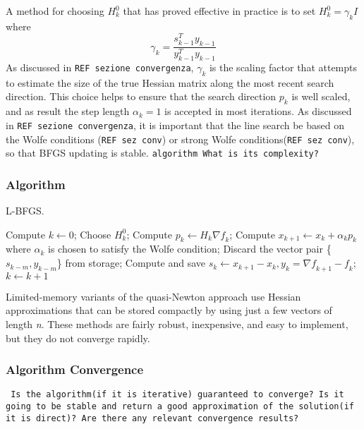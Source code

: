 A method for choosing $H^0_{k}$ that has proved effective in practice is to set $H^0_{k}=\gamma_{k}I$  where 
\begin{equation}
\gamma_{k}= \frac{s^T_{k-1}y_{k-1}}{y^T_{k-1}y_{k-1}}
\end{equation}
As discussed in \texttt{REF sezione convergenza}, $\gamma_{k}$ is the scaling factor that attempts to estimate the size of the true Hessian matrix along the most recent search direction. This choice helps to ensure that the search direction $p_{k}$ is well scaled, and as result the step length $\alpha_{k}=1$ is accepted in most iterations. As discussed in \texttt{REF sezione convergenza}, it is important that the line search be based on the Wolfe conditions (\texttt{REF sez conv}) or strong Wolfe conditions(\texttt{REF sez conv}), so that BFGS updating is stable. 
\texttt{algorithm What is its complexity?}

\subsubsection{Algorithm}
\begin{algorithm}[H]
	\caption{L-BFGS.}
	\label{alg:sgd}
	\begin{algorithmic}[4]
		\State Compute $k \gets 0$;
		\Repeat
		\State Choose \textbf{$H^0_k$};
		\State Compute $p_k \gets H_k\nabla \textit{f}_k$;
		\State Compute $x_{k+1} \gets x_{k}+ \alpha_{k}p_{k}$ where $\alpha_{k}$ is chosen to satisfy the Wolfe condition;
		\State Discard the vector pair \{$s_{k-m},y_{k-m}$\} from storage;
		\EndIf
		\State Compute and save $s_k \gets x_{k+1}-x_{k}, y_k=\nabla \textit{f}_{k+1}-\textit{f}_k$;
		\State $k \gets k+1$
		\EndProcedure 
	\end{algorithmic}
\end{algorithm}


Limited-memory variants  of  the  quasi-Newton  approach use  Hessian  approximations  that  can  be stored compactly by using just a few vectors of length \textit{n}. These methods are fairly robust, inexpensive, and easy to implement, but they do not converge rapidly.

\subsubsection{Algorithm Convergence}
\texttt{ Is the algorithm(if it is iterative) guaranteed to converge? Is it going to be stable and return a good approximation of the solution(if it is direct)?  Are there any relevant convergence results?}
 
